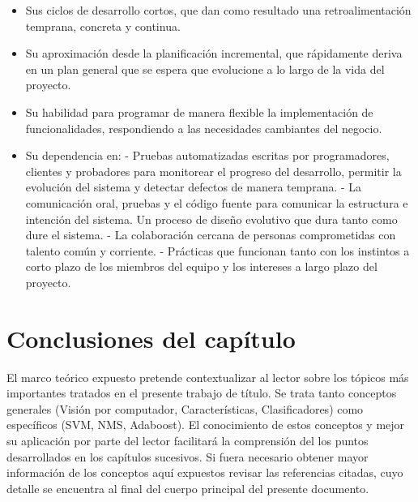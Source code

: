\begin{itemize}
\item Sus ciclos de desarrollo cortos, que dan como resultado una retroalimentación temprana, concreta y continua.
\item Su aproximación desde la planificación incremental, que rápidamente deriva en un plan general que se espera que evolucione a lo largo de la vida del proyecto.
\item Su habilidad para programar de manera flexible la implementación de funcionalidades, respondiendo a las necesidades cambiantes del negocio.
\item Su dependencia en:
\subitem - Pruebas automatizadas escritas por programadores, clientes y probadores para monitorear el progreso del desarrollo, permitir la evolución del sistema y detectar defectos de manera temprana.
\subitem - La comunicación oral, pruebas y el código fuente para comunicar la estructura e intención del sistema.
\subitem Un proceso de diseño evolutivo que dura tanto como dure el sistema.
\subitem - La colaboración cercana de personas comprometidas con talento común y corriente.
\subitem - Prácticas que funcionan tanto con los instintos a corto plazo de los miembros del equipo y los intereses a largo plazo del proyecto. 
\end{itemize}


\section{Conclusiones del capítulo}
\label{preliminares:conclusiones}


El marco teórico expuesto pretende contextualizar al lector sobre los tópicos más importantes tratados en el presente trabajo de título. Se trata tanto conceptos generales (Visión por computador, Características, Clasificadores) como específicos (SVM, NMS, Adaboost). El conocimiento de estos conceptos y mejor su aplicación por parte del lector facilitará la comprensión del los puntos desarrollados en los capítulos sucesivos. Si fuera necesario obtener mayor información de los conceptos aquí expuestos revisar las referencias citadas, cuyo detalle se encuentra al final del cuerpo principal del presente documento. 

